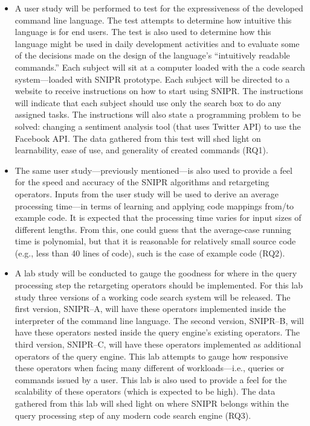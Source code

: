 \documentclass[conference]{IEEEtran}
\begin{document}
\begin{itemize}  
\item A user study will be performed to test for the expressiveness of the developed command line language. The test attempts to determine how intuitive this language is for end users. The test is also used to determine how this language might be used in daily development activities and to evaluate some of the decisions made on the design of the language's ``intuitively readable commands.'' Each subject will sit at a computer loaded with the a code search system---loaded with \uppercase{SnipR} prototype. Each subject will be directed to a website to receive instructions on how to start using \uppercase{SnipR}. The instructions will indicate that each subject should use only the search box to do any assigned tasks. The instructions will also state a programming problem to be solved: changing a sentiment analysis tool (that uses Twitter API) to use the Facebook API. The data gathered from this test will shed light on learnability, ease of use, and generality of created commands (RQ1).
\item The same user study---previously mentioned---is also used to provide a feel for the speed and accuracy of the  \uppercase{SnipR} algorithms and retargeting operators. Inputs from the user study will be used to derive an average processing time---in terms of learning and applying code mappings from/to example code. It is expected that the processing time varies for input sizes of different lengths. From this, one could guess that the average-case running time is polynomial, but that it is reasonable for relatively small source code (e.g., less than 40 lines of code), such is the case of example code (RQ2). 
\item A lab study will be conducted to gauge the goodness for where in the query processing step the retargeting operators should be implemented. For this lab study three versions of a working code search system will be released. The first version, \uppercase{SnipR}--A, will have these operators implemented inside the interpreter of the command line language. The second version, \uppercase{SnipR}--B, will have these operators nested inside the query engine's existing operators. The third version, \uppercase{SnipR}--C, will have these operators implemented as additional operators of the query engine. This lab attempts to gauge how responsive these operators when facing many different of workloads---i.e., queries or commands issued by a user. This lab is also used to provide a feel for the scalability of these operators (which is expected to be high). The data gathered from this lab will shed light on where \uppercase{SnipR} belongs within the query processing step of any modern code search engine (RQ3). 

\end{itemize}
\end{document}
